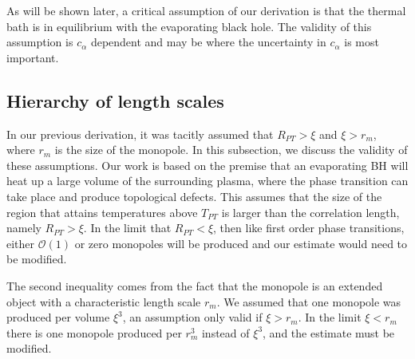 \documentclass[superscriptaddress,groupedaddress,nofootnoteinbib,11pt]{article}
\begin{document}
As will be shown later, a critical assumption of our derivation is that the thermal bath is in equilibrium with the evaporating black hole.  The validity of this assumption is $c_{\alpha}$ dependent and may be where the uncertainty in $c_{\alpha}$ is most important.

\subsection{Hierarchy of length scales}

In our previous derivation, it was tacitly assumed that $R_{PT} > \xi$ and $\xi > r_m$, where $r_m$ is the size of the monopole.  In this subsection, we discuss the validity of these assumptions.
Our work is based on the premise that an evaporating BH will heat up a large volume of the surrounding plasma, where the phase transition can take place and produce topological defects. This assumes that the size of the region that attains temperatures above $T_{PT}$ is larger than the correlation length, namely $R_{PT}>\xi$. 
In the limit that $R_{PT} < \xi$, then like first order phase transitions, either $\mathcal{O}(1)$ or zero monopoles will be produced and our estimate would need to be modified. 

The second inequality comes from the fact that the monopole is an extended object with a characteristic length scale $r_m$.  We assumed that one monopole was produced per volume $\xi^3$, an assumption only valid if $\xi>r_m$.  In the limit $\xi < r_m$ there is one monopole produced per $r_m^3$ instead of $\xi^3$, and the estimate must be modified.
\end{document}
